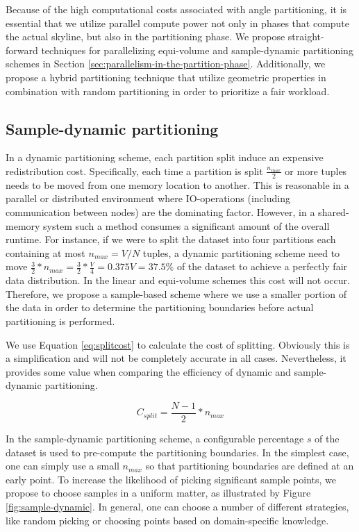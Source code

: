\documentclass[12pt,a4paper,twoside]{report}
\begin{document}
Because of the high computational costs associated with angle
partitioning, it is essential that we utilize parallel compute
power not only in phases that compute the actual skyline, but also
in the partitioning phase. We propose straight-forward techniques
for parallelizing equi-volume and sample-dynamic partitioning
schemes in Section \ref{sec:parallelism-in-the-partition-phase}.
Additionally, we propose a hybrid partitioning technique that
utilize geometric properties in combination with random
partitioning in order to prioritize a fair workload. 

\subsection{Sample-dynamic partitioning}
\label{sec:sample-dynamic-partitioning}

In a dynamic partitioning scheme, each partition split induce an
expensive redistribution cost. Specifically, each time a
partition is split $\frac{n_{max}}{2}$ or more tuples needs to be
moved from one memory location to another. This is reasonable in a
parallel or distributed environment where IO-operations (including
communication between nodes) are the dominating factor. However,
in a shared-memory system such a method consumes a significant
amount of the overall runtime. For instance, if we were to split
the dataset into four partitions each containing at most $n_{max}
= V/N$ tuples, a dynamic partitioning scheme need to move
$\frac{3}{2} * n_{max} = \frac{3}{2} * \frac{V}{4} = 0.375V =
37.5\%$ of the dataset to achieve a perfectly fair data
distribution. In the linear and equi-volume schemes this cost will
not occur. Therefore, we propose a sample-based scheme where we
use a smaller portion of the data in order to determine the
partitioning boundaries before actual partitioning is performed.

We use Equation \ref{eq:splitcost} to calculate the cost of
splitting. Obviously this is a simplification and will not be
completely accurate in all cases. Nevertheless, it provides some
value when comparing the efficiency of dynamic and sample-dynamic
partitioning.

\begin{equation}
	C_{split} = \frac{N-1}{2} * n_{max}
	\label{eq:splitcost}
\end{equation} 

In the sample-dynamic partitioning scheme, a configurable
percentage $s$ of the dataset is used to pre-compute the
partitioning boundaries. In the simplest case, one can simply use
a small $n_{max}$ so that partitioning boundaries are defined at
an early point. To increase the likelihood of picking significant
sample points, we propose to choose samples in a uniform matter,
as illustrated by Figure \ref{fig:sample-dynamic}. In general, one
can choose a number of different strategies, like random picking
or choosing points based on domain-specific knowledge.
\end{document}
